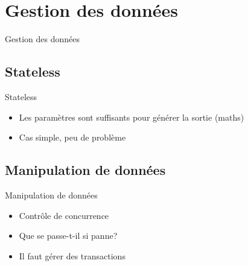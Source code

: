\def\sectitle{Gestion des données}
\section{\sectitle}
\begin{frame}{\sectitle}
    \def\subsectitle{Stateless}
    \subsection{\subsectitle}
    \begin{block}{\subsectitle}
        \begin{itemize}
            \item Les paramètres sont suffisants pour générer la sortie (maths)
            \item Cas simple, peu de problème
        \end{itemize}
    \end{block}
    \def\subsectitle{Manipulation de données}
    \subsection{\subsectitle}
    \begin{block}{\subsectitle}
        \begin{itemize}
            \item Contrôle de concurrence
            \item Que se passe-t-il si panne?
            \item Il faut gérer des transactions
        \end{itemize}
    \end{block}
\end{frame}

\def\sectitle{Information d'historique}
